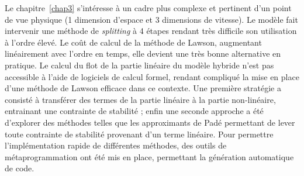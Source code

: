 Le chapitre~\ref{chap3} s'intéresse à un cadre plus complexe et pertinent d'un point de vue physique (1 dimension d'espace et 3 dimensions de vitesse). Le modèle fait intervenir une méthode de \emph{splitting} à 4 étapes rendant très difficile son utilisation à l'ordre élevé. Le coût de calcul de la méthode de Lawson, augmentant linéairement avec l'ordre en temps, elle devient une très bonne alternative en pratique. Le calcul du flot de la partie linéaire du modèle hybride n'est pas accessible à l'aide de logiciels de calcul formel, rendant compliqué la mise en place d'une méthode de Lawson efficace dans ce contexte. Une première stratégie a consisté à transférer des termes de la partie linéaire à la partie non-linéaire, entrainant une contrainte de stabilité ; enfin une seconde approche a été d'explorer des méthodes telles que les approximants de Padé permettant de lever toute contrainte de stabilité provenant d'un terme linéaire. Pour permettre l'implémentation rapide de différentes méthodes, des outils de métaprogrammation ont été mis en place, permettant la génération automatique de code.

